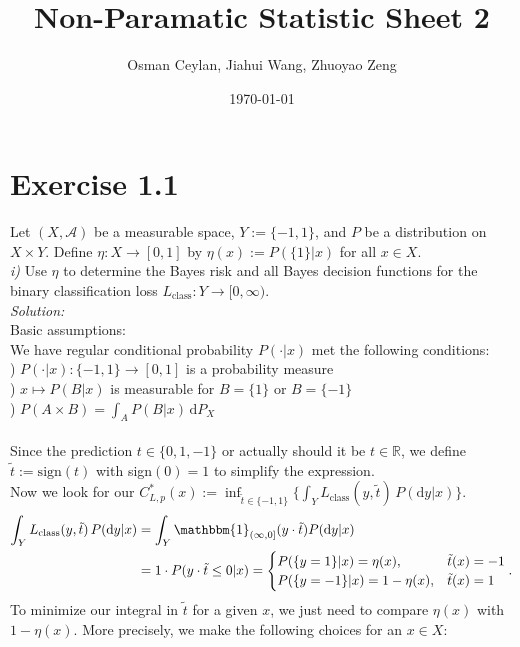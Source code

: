 \documentclass{article}
\title{Non-Paramatic Statistic Sheet 2}
\author{Osman Ceylan, Jiahui Wang, Zhuoyao Zeng}
\date{\today}
\begin{document}
\maketitle
\section*{Exercise 1.1}
Let $(X, \mathcal{A})$ be a measurable space, $Y := \{-1,1\}$, and $P$ be a distribution on $X \times Y$. Define $\eta: X \rightarrow [0,1]$ by $\eta(x) := P(\{1\}|x)$ for all $x \in X$.\vspace{0.7em}\\
\textsl{i)} Use $\eta$ to determine the Bayes risk and all Bayes decision functions for the binary classification loss $L_\text{class}:Y \rightarrow [0,\infty )$.\vspace{0.5em}\\
\textsl{Solution:} \\
Basic assumptions:\\
We have regular conditional probability $P(\cdot|x)$ met the following conditions:\\ 
) $P(\cdot|x):\{-1,1\} \rightarrow [0,1]$ is a probability measure \\
) $x \mapsto P(B|x)$ is measurable for $B = \{1\}$ or $B = \{-1\}$ \\
) $P(A \times B) = \displaystyle{ \int_{A} P(B|x)\, \text{d}P_X  }$\\
 \\
Since the prediction $t \in \{0,1,-1\}$ or actually should it be $t \in \mathbb{R}$, we define $\tilde{t}:= \text{sign}(t)$ with sign$(0) = 1$ to simplify the expression. \\
Now we look for our $C^*_{L,p}(x):= \inf_{\tilde{t}\in \{-1,1\}}\{\displaystyle{ \int_{Y} L_\text{class}(y,\tilde{t})\, P(\text{d}y|x)} \}$.  
\begin{align*}
\displaystyle{ \int_{Y} L_\text{class}(y,\tilde{t})\, P(\text{d}y|x) }
 & = \displaystyle{ \int_{Y} \mathbbm{1}_{(\infty,0]}(y\cdot\tilde{t}) P(\text{d}y|x)} \\
 & = 1 \cdot P(y\cdot\tilde{t} \leq 0 | x) =  \begin{cases} P(\{y=1\}|x) = \eta(x), &\tilde{t}(x) = -1 \cr  P(\{y=-1\}|x) = 1- \eta(x), &\tilde{t}(x) = 1 \end{cases}.
\end{align*}
To minimize our integral in $\tilde{t}$ for a given $x$, we just need to compare $\eta(x)$ with $1 - \eta(x)$. More precisely, we make the following choices for an $x\in X$:\\
\end{document}
